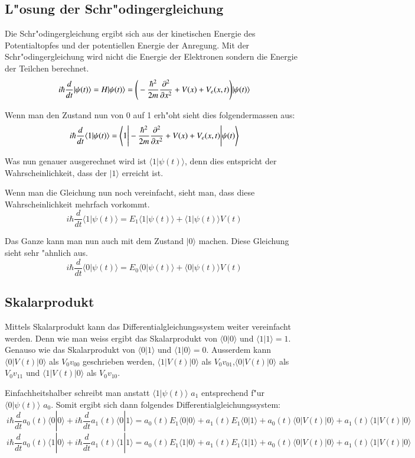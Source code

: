 \begin{refsection}
\subsection{L"osung der Schr"odingergleichung}
Die Schr"odingergleichung ergibt sich aus der kinetischen Energie des
Potentialtopfes und der potentiellen Energie der Anregung.
Mit der Schr"odingergleichung wird nicht die Energie der Elektronen
sondern die Energie der Teilchen berechnet.
\[
\ i\hbar\frac{d}{dt}|\psi(t)\rangle = H|\psi(t)\rangle = \Bigg{(}-\frac{\hbar^2}{2m} \frac{\partial^2}{\partial x^2}+V(x)+V_{e}(x,t)\Bigg{)}|\psi(t)\rangle
\]

Wenn man den Zustand nun von 0 auf 1 erh"oht sieht dies folgendermassen aus:
\[
\ i\hbar\frac{d}{dt}\langle1|\psi(t)\rangle = \Bigg{\langle}1\Bigg{|}-\frac{\hbar^2}{2m} \frac{\partial^2}{\partial x^2}+V(x)+V_{e}(x,t)\Bigg{|}\psi(t)\Bigg{\rangle}
\]

Was nun genauer ausgerechnet wird ist $\langle1|\psi(t)\rangle$, denn
dies entspricht der Wahrscheinlichkeit, dass der $|1\rangle$ erreicht ist.

Wenn man die Gleichung nun noch vereinfacht, sieht man, dass diese
Wahrscheinlichkeit mehrfach vorkommt.
\[
\ i\hbar\frac{d}{dt}\langle1|\psi(t)\rangle = E_{1}\langle1|\psi(t)\rangle+\langle1|\psi(t)\rangle V(t)
\]

Das Ganze kann man nun auch mit dem Zustand $|0\rangle$ machen. Diese
Gleichung sieht sehr "ahnlich aus.
\[
\ i\hbar\frac{d}{dt}\langle0|\psi(t)\rangle = E_{0}\langle0|\psi(t)\rangle+\langle0|\psi(t)\rangle V(t)
\]

\subsection{Skalarprodukt}

Mittels Skalarprodukt kann das Differentialgleichungssystem weiter
vereinfacht werden.
Denn wie man weiss ergibt das Skalarprodukt von $\langle0|0\rangle$
und $\langle1|1\rangle = 1$.
Genauso wie das Skalarprodukt von $\langle0|1\rangle$ und
$\langle1|0\rangle = 0$.
Ausserdem kann  $\langle0|V(t)|0\rangle$ als $V_{0}v_{00}$ geschrieben
werden, $\langle1|V(t)|0\rangle$ als $V_{0}v_{01}$,$\langle0|V(t)|0\rangle$
als $V_{0}v_{11}$ und $\langle1|V(t)|0\rangle$ als $V_{0}v_{10}$.

Einfachheitshalber schreibt man anstatt $\langle1|\psi(t)\rangle$ $a_1$
entsprechend f"ur $\langle0|\psi(t)\rangle$ $a_0$.
Somit ergibt sich dann folgendes Differentialgleichungssystem:
\[
\ i\hbar\frac{d}{dt}a_{0}(t)\langle0|0\rangle +i\hbar\frac{d}{dt}a_{1}(t)\langle0|1\rangle = a_{0}(t)E_{1}\langle0|0\rangle + a_{1}(t)E_{1}\langle0|1\rangle + a_{0}(t)\langle0|V(t)|0\rangle+ a_{1}(t)\langle1|V(t)|0\rangle
\]
\[
\ i\hbar\frac{d}{dt}a_{0}(t)\langle1|0\rangle +i\hbar\frac{d}{dt}a_{1}(t)\langle1|1\rangle = a_{0}(t)E_{1}\langle1|0\rangle + a_{1}(t)E_{1}\langle1|1\rangle + a_{0}(t)\langle0|V(t)|0\rangle+ a_{1}(t)\langle1|V(t)|0\rangle
\]


\end{refsection}

